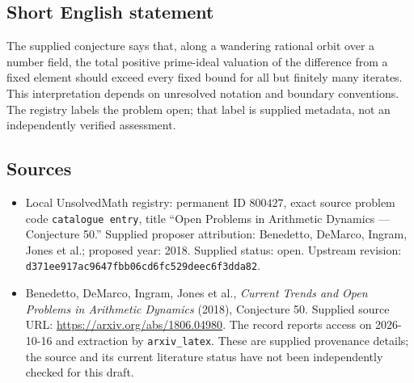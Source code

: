 \documentclass[11pt]{article}
\begin{document}
\subsection{Short English statement}
The supplied conjecture says that, along a wandering rational orbit over a number field, the total positive prime-ideal valuation of the difference from a fixed element should exceed every fixed bound for all but finitely many iterates. This interpretation depends on unresolved notation and boundary conventions. The registry labels the problem open; that label is supplied metadata, not an independently verified assessment.
\subsection{Sources}
\begin{itemize}
\item Local UnsolvedMath registry: permanent ID $800427$, exact source problem code \texttt{catalogue entry}, title ``Open Problems in Arithmetic Dynamics --- Conjecture 50.'' Supplied proposer attribution: Benedetto, DeMarco, Ingram, Jones et al.; proposed year: 2018. Supplied status: open. Upstream revision: \texttt{d371ee917ac9647fbb06cd6fc529deec6f3dda82}.
\item Benedetto, DeMarco, Ingram, Jones et al., \emph{Current Trends and Open Problems in Arithmetic Dynamics} (2018), Conjecture 50. Supplied source URL: \url{https://arxiv.org/abs/1806.04980}. The record reports access on 2026-10-16 and extraction by \texttt{arxiv\_latex}. These are supplied provenance details; the source and its current literature status have not been independently checked for this draft.
\end{itemize}
\end{document}
